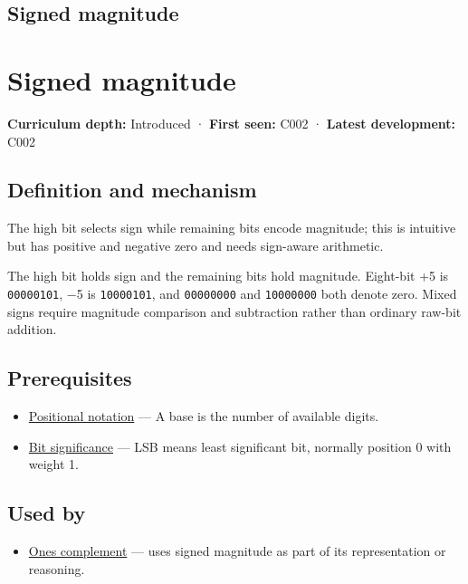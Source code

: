 \hypertarget{appendix-ce20506c8532}{}
\section*{Signed magnitude}
\chapter{Signed magnitude}\label{appendix-ce20506c8532-signed-magnitude}

\textbf{Curriculum depth:} Introduced · \textbf{First seen:} C002 · \textbf{Latest development:} C002

\section{Definition and mechanism}\label{appendix-ce20506c8532-definition-and-mechanism}

The high bit selects sign while remaining bits encode magnitude; this is intuitive but has positive and negative zero and needs sign-aware arithmetic.

The high bit holds sign and the remaining bits hold magnitude. Eight-bit +5 is \texttt{00000101}, −5 is \texttt{10000101}, and \texttt{00000000} and \texttt{10000000} both denote zero. Mixed signs require magnitude comparison and subtraction rather than ordinary raw-bit addition.

\section{Prerequisites}\label{appendix-ce20506c8532-prerequisites}

\begin{itemize}
\tightlist
\item
  \hyperref[appendix-83c3f28f7bda]{Positional notation} --- A base is the number of available digits.
\item
  \hyperref[appendix-280445746493]{Bit significance} --- LSB means least significant bit, normally position 0 with weight 1.
\end{itemize}

\section{Used by}\label{appendix-ce20506c8532-used-by}

\begin{itemize}
\tightlist
\item
  \hyperref[appendix-03c678cd40b3]{One\textquotesingle s complement} --- uses signed magnitude as part of its representation or reasoning.
\end{itemize}


